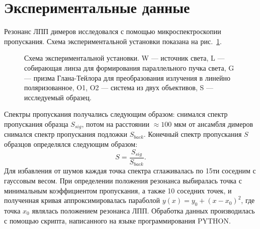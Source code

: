 \section{Экспериментальные данные}

Резонанс ЛПП димеров исследовался с помощью микроспектроскопии пропускания. Схема экспериментальной установки показана на рис.~\ref{img:expsetup}.
\begin{figure}
\caption{Схема экспериментальной установки. W --- источник света, L --- собирающая линза для формирования параллельного пучка света, G --- призма Глана-Тейлора для преобразования излучения в линейно поляризованное, O1, O2 --- система из двух объективов, S --- исследуемый образец. }
\label{img:expsetup}
\end{figure}
Спектры пропускания получались следующим образом: снимался спектр пропускания образца $ S_{sig} $, потом на расстоянии $ \approx 100 $ мкм от ансамбля димеров снимался спектр пропускания подложки $ S_{back} $. Конечный спектр пропускания $ S $ образцов определялся следующим образом:
\begin{equation}
S = \frac{S_{sig}}{S_{back}}.
\end{equation}
Для избавления от шумов каждая точка спектра сглаживалась по 15ти соседним с гауссовым весом. При определении положения резонанса выбиралась точка с минимальным коэффициентом пропускания, а также 10 соседних точек, и полученная кривая аппроксимировалась параболой $ y(x) = y_0 + (x - x_0)^2 $, где точка $ x_0 $ являлась положением резонанса ЛПП. Обработка данных производилась с помощью скрипта, написанного на языке программирования PYTHON. 

